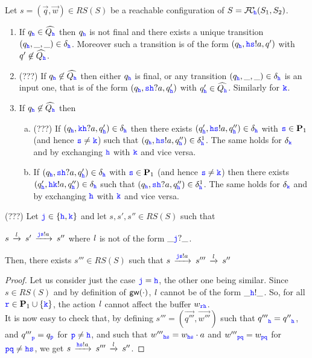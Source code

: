 \begin{fact}
\label{fact:uniquesending}
Let $s= (\vec{q},\vec{w}) \in RS(S)$ be a reachable configuration of
$S =\fusioncomp_{\!\hh}(S_1,S_2)$.
\begin{enumerate}
\item
\label{fact:uniquesending-i}
If ${q_\HH} \in\widehat{Q_\HH}$ then
${q_\HH}$ is not final and
 there exists a unique transition $({q_\HH},\_,\_)\in\delta_\HH$.
  Moreover such a transition is of the form
 $(q_\HH,\HH\tts!a,q')$ with $q'\not\in\widehat{Q_\HH}$.

\item
\label{fact:uniquesending-ii}
(???) If ${q_\HH}\not\in\widehat{Q_\HH}$ then either $q_\HH$ is final, or any transition $({q_\HH},\_,\_)\in\delta_\HH$
is an input  one, that 
is of the form $({q_\HH},\tts\HH?a,{q'_\HH})$ with ${q'_\HH}\in\widehat{Q_\HH}$. Similarly for $\KK$.
\item
\label{fact:uniquesending-iii}
If ${q_\HH}\not\in\widehat{Q_\HH}$ then
             \begin{enumerate}[a)]
\item
(???) If $(q_\HH,\KK\HH?a,{q'_\HH})\in\delta_\HH$  then there exists $({q'_\HH},\HH\tts!a,q''_\HH)\in\delta_\HH$ with $\tts \in \roles_1$ (and hence $\tts \neq \KK$) 
such that $(q_\HH,\HH\tts!a,q''_\HH)\in\delta^1_\HH$.
The same holds for $\delta_\KK$ and by exchanging $\HH$ with $\KK$ and vice versa.
\item
If $(q_\HH,\tts\HH?a, {q'_\HH})\in\delta_\HH$ with $\tts \in \roles_1$ (and hence $\tts \neq \KK$)  then there exists   $({q'_\HH},\HH\KK!a,q''_\HH)\in\delta_\HH$  
such that $(q_\HH,\tts\HH?a,q''_\HH)\in\delta^1_\HH$.
The same holds for $\delta_\KK$ and by exchanging $\HH$ with $\KK$ and vice versa.
              \end{enumerate}
\end{enumerate}
\end{fact}




\begin{lemma}
\label{lem:swap}
(???) Let $\JJ\in\Set{\HH,\KK}$ and 
let $s,s',s''\in RS(S)$  such that\\
\centerline{$s\lts{\elle}s'\lts{\JJ\tts!a}s''$ where
$\elle$ is not of the form $\_\JJ?\_$.}
Then, there exists $s'''\in RS(S)$ such that $s\lts{\JJ\tts!a}s'''\lts{\elle}s''$
\end{lemma}

\begin{proof}
Let us consider just the case $\JJ=\HH$, the other one being similar.
Since $s\in RS(S)$ and by definition of $\gateway{\cdot}$, $\elle$ cannot be of the form $\_\HH!\_$.
So, for all $\ttr\in\roles_1\cup\Set{\KK}$, the action $\elle$ cannot affect the buffer ${w}_{\ttr\HH}$.\\
It is now easy to check that, by defining $s'''=(\vec{q'''},\vec{w'''})$ such that  
${q'''}_{\HH} = {q''}_{\HH}$,  and ${q'''}_{\ttp} = {q}_{\ttp}$ for $\ttp\neq \HH$,
and such that
${w'''}_{\HH\tts} = {w}_{\HH\tts}\cdot a$ and  ${w'''}_{\ttp\ttq} = {w}_{\ttp\ttq}$ for $\ttp\ttq\neq \HH\tts$, we get $s\lts{\HH\tts!a}s'''\lts{\elle}s''$.
\end{proof}




